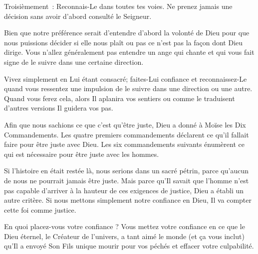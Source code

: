 Troisièmement~: \og Reconnais-Le dans toutes tes voies. \fg{}
 Ne prenez jamais une décision sans avoir d'abord consulté le Seigneur. 


Bien que notre préférence serait d'entendre d'abord la volonté de Dieu
 \ocadr pour que nous puissions décider si elle nous plaît ou pas \fg{}
 ce n'est pas la façon dont Dieu dirige.
 Vous n'allez généralement pas entendre un ange qui chante
 et qui vous fait signe de le suivre dans une certaine direction. 

Vivez simplement en Lui étant consacré; faites-Lui confiance
 et reconnaissez-Le quand vous ressentez une impulsion de le suivre
 dans une direction ou une autre.
 Quand vous ferez cela, alors \og Il aplanira vos sentiers \fg{}
 ou comme le traduisent d'autres versions \og Il guidera vos pas. \fg{}

\dvrule






Afin que nous sachions ce que c'est qu'être juste,
 Dieu a donné à Moïse les Dix Commandements.
 Les quatre premiers commandements déclarent ce qu'il fallait faire
 pour être juste avec Dieu.
 Les six commandements suivants énumèrent ce qui est nécessaire
 pour être juste avec les hommes. 

Si l'histoire en était restée là, nous serions dans un sacré pétrin,
 parce qu'aucun de nous ne pourrait jamais être juste.
 Mais parce qu'Il savait que l'homme n'est pas capable d'arriver
 à la hauteur de ces exigences de justice, Dieu a établi un autre critère.
 Si nous mettons simplement notre confiance en Dieu,
 Il va compter cette foi comme justice. 

En quoi placez-vous votre confiance ?
 Vous mettez votre confiance en ce que le Dieu éternel,
 le Créateur de l'univers, a tant aimé le monde (et ça vous inclut)
 qu'Il a envoyé Son Fils unique mourir pour vos péchés
 et effacer votre culpabilité. 


